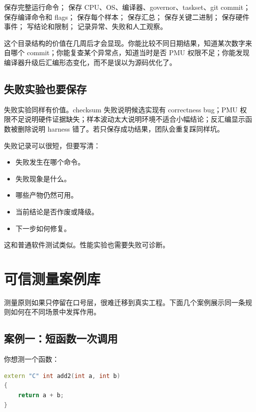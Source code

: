  保存完整运行命令； 保存 CPU、OS、编译器、governor、taskset、git commit； 保存编译命令和 flags； 保存每个样本； 保存汇总； 保存关键二进制； 保存硬件事件； 写结论和限制； 记录异常、失败和人工观察。

这个目录结构的价值在几周后才会显现。你能比较不同日期结果，知道某次数字来自哪个 commit；你能复查某个异常点，知道当时是否 PMU 权限不足；你能发现编译器升级后汇编形态变化，而不是误以为源码优化了。

\subsection{失败实验也要保存}

失败实验同样有价值。checksum 失败说明候选实现有 correctness bug；PMU 权限不足说明硬件证据缺失；样本波动太大说明环境不适合小幅结论；反汇编显示函数被删除说明 harness 错了。若只保存成功结果，团队会重复踩同样坑。

失败记录可以很短，但要写清：

\begin{itemize}
  \item 失败发生在哪个命令。
  \item 失败现象是什么。
  \item 哪些产物仍然可用。
  \item 当前结论是否作废或降级。
  \item 下一步如何修复。
\end{itemize}

这和普通软件测试类似。性能实验也需要失败可诊断。

\section{可信测量案例库}

测量原则如果只停留在口号层，很难迁移到真实工程。下面几个案例展示同一条规则如何在不同场景中发挥作用。

\subsection{案例一：短函数一次调用}

你想测一个函数：

\begin{lstlisting}[language=C++]
extern "C" int add2(int a, int b)
{
    return a + b;
}
\end{lstlisting}

